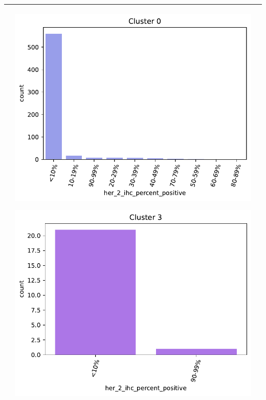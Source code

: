 \begin{table}[htb!]
\begin{threeparttable}
\begin{tabular}{p{2.5cm} p{7cm} p{6.5cm}}
			& 
			\begin{center}\includegraphics[width=1\linewidth]{NOTEBOOK/IMAGENES_BIRCH_CLUSTERING/5_Cluster_0_her_2_ihc_percent_positive}\end{center}
			\begin{center}\includegraphics[width=1\linewidth]{NOTEBOOK/IMAGENES_BIRCH_CLUSTERING/5_Cluster_3_her_2_ihc_percent_positive}\end{center}
			
			\\ \hline
		\end{tabular}
	\end{threeparttable}
\end{table}

